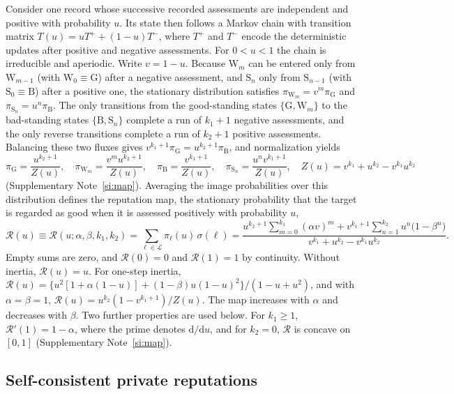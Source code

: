 \documentclass[fleqn,10pt]{wlscirep}
\newcommand{\Rmap}{\mathscr{R}}            %
\newcommand{\Lspace}{\mathscr{L}}          %
\newcommand{\st}[1]{\mathrm{#1}}           %
\newcommand{\dd}{\mathrm{d}}
\theoremstyle{plain}
\begin{document}
Consider one record whose successive recorded assessments are independent and positive with probability $u$. Its state then follows a Markov chain with transition matrix $T(u)=uT^++(1-u)T^-$, where $T^+$ and $T^-$ encode the deterministic updates after positive and negative assessments. For $0<u<1$ the chain is irreducible and aperiodic. Write $v=1-u$. Because $\st W_m$ can be entered only from $\st W_{m-1}$ (with $\st W_0\equiv\st G$) after a negative assessment, and $\st S_n$ only from $\st S_{n-1}$ (with $\st S_0\equiv\st B$) after a positive one, the stationary distribution satisfies $\pi_{\st W_m}=v^m\pi_{\st G}$ and $\pi_{\st S_n}=u^n\pi_{\st B}$. The only transitions from the good-standing states $\{\st G,\st W_m\}$ to the bad-standing states $\{\st B,\st S_n\}$ complete a run of $k_1+1$ negative assessments, and the only reverse transitions complete a run of $k_2+1$ positive assessments. Balancing these two fluxes gives $v^{k_1+1}\pi_{\st G}=u^{k_2+1}\pi_{\st B}$, and normalization yields
\begin{equation}
\pi_{\st G}=\frac{u^{k_2+1}}{Z(u)},\quad
\pi_{\st W_m}=\frac{v^mu^{k_2+1}}{Z(u)},\quad
\pi_{\st B}=\frac{v^{k_1+1}}{Z(u)},\quad
\pi_{\st S_n}=\frac{u^nv^{k_1+1}}{Z(u)},\quad
Z(u)=v^{k_1}+u^{k_2}-v^{k_1}u^{k_2}
\label{eq:m-stationary}
\end{equation}
(Supplementary Note~\ref{si:map}). Averaging the image probabilities over this distribution defines the reputation map, the stationary probability that the target is regarded as good when it is assessed positively with probability $u$,
\begin{equation}
\Rmap(u)\equiv\Rmap(u;\alpha,\beta,k_1,k_2)=\sum_{\ell\in\Lspace}\pi_\ell(u)\,\sigma(\ell)
=\frac{u^{k_2+1}\sum_{m=0}^{k_1}(\alpha v)^m+v^{k_1+1}\sum_{n=1}^{k_2}u^n\bigl(1-\beta^n\bigr)}{v^{k_1}+u^{k_2}-v^{k_1}u^{k_2}}.
\label{eq:m-map}
\end{equation}
Empty sums are zero, and $\Rmap(0)=0$ and $\Rmap(1)=1$ by continuity. Without inertia, $\Rmap(u)=u$. For one-step inertia, $\Rmap(u)=\{u^2[1+\alpha(1-u)]+(1-\beta)u(1-u)^2\}/(1-u+u^2)$, and with $\alpha=\beta=1$, $\Rmap(u)=u^{k_2}(1-v^{k_1+1})/Z(u)$. The map increases with $\alpha$ and decreases with $\beta$. Two further properties are used below. For $k_1\geq1$, $\Rmap'(1)=1-\alpha$, where the prime denotes $\dd/\dd u$, and for $k_2=0$, $\Rmap$ is concave on $[0,1]$ (Supplementary Note~\ref{si:map}).

\subsection*{Self-consistent private reputations}
\end{document}
